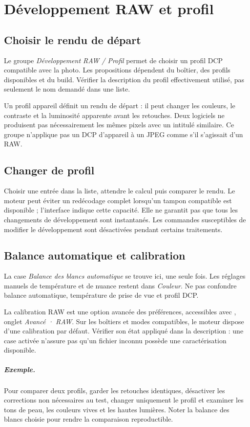 \chapter{Développement RAW et profil}
\section{Choisir le rendu de départ}
Le groupe \emph{Développement RAW / Profil} permet de choisir un profil DCP
compatible avec la photo. Les propositions dépendent du boîtier, des profils
disponibles et du build. Vérifier la description du profil effectivement utilisé,
pas seulement le nom demandé dans une liste.

Un profil appareil définit un rendu de départ : il peut changer les couleurs,
le contraste et la luminosité apparente avant les retouches. Deux logiciels
ne produisent pas nécessairement les mêmes pixels avec un intitulé similaire.
Ce groupe n’applique pas un DCP d’appareil à un JPEG comme s’il s’agissait d’un RAW.

\section{Changer de profil}
Choisir une entrée dans la liste, attendre le calcul puis comparer le rendu.
Le moteur peut éviter un redécodage complet lorsqu’un tampon compatible est
disponible ; l’interface indique cette capacité. Elle ne garantit pas que
tous les changements de développement sont instantanés.
Les commandes susceptibles de modifier le développement sont désactivées
pendant certains traitements.

\section{Balance automatique et calibration}
La case \emph{Balance des blancs automatique} se trouve ici, une seule fois.
Les réglages manuels de température et de nuance restent dans \emph{Couleur}.
Ne pas confondre balance automatique, température de prise de vue et profil DCP.

La calibration RAW est une option avancée des préférences, accessibles avec
, onglet \emph{Avancé · RAW}. Sur les boîtiers et modes
compatibles, le moteur dispose d’une calibration par défaut. Vérifier son état
appliqué dans la description : une case activée n’assure pas qu’un fichier
inconnu possède une caractérisation disponible.


\paragraph{Exemple.}
Pour comparer deux profils, garder les retouches identiques, désactiver les
corrections non nécessaires au test, changer uniquement le profil et examiner
les tons de peau, les couleurs vives et les hautes lumières. Noter la balance
des blancs choisie pour rendre la comparaison reproductible.
